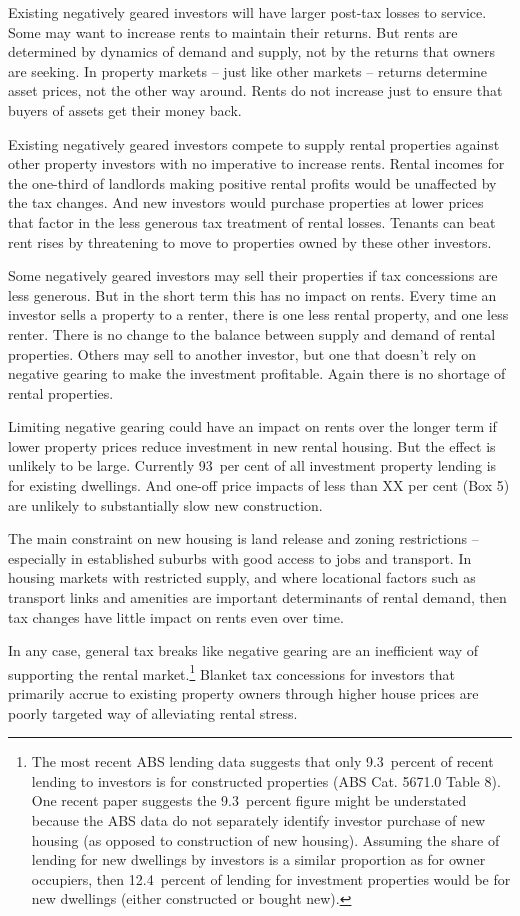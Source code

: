 \documentclass{grattan}\usepackage[]{graphicx}\usepackage[]{color}
\begin{document}
Existing negatively geared investors will have larger post-tax losses to service. Some may want to increase rents to maintain their returns. But rents are determined by dynamics of demand and supply, not by the returns that owners are seeking. In property markets -- just like other markets -- returns determine asset prices, not the other way around. Rents do not increase just to ensure that buyers of assets get their money back.

Existing negatively geared investors compete to supply rental properties against other property investors with no imperative to increase rents. Rental incomes for the one-third of landlords making positive rental profits would be unaffected by the tax changes. And new investors would purchase properties at lower prices that factor in the less generous tax treatment of rental losses. Tenants can beat rent rises by threatening to move to properties owned by these other investors. 

Some negatively geared investors may sell their properties if tax concessions are less generous. But in the short term this has no impact on rents.  Every time an investor sells a property to a renter, there is one less rental property, and one less renter. There is no change to the balance between supply and demand of rental properties. Others may sell to another investor, but one that doesn't rely on negative gearing to make the investment profitable. Again there is no shortage of rental properties. 

Limiting negative gearing could have an impact on rents over the longer term if lower property prices reduce investment in new rental housing. But the effect is unlikely to be large. Currently 93~per cent of all investment property lending is for existing dwellings.  And one-off price impacts of less than XX per cent (Box 5) are unlikely to substantially slow new construction.  

The main constraint on new housing is land release and zoning restrictions -- especially in established suburbs with good access to jobs and transport.    In housing markets with restricted supply, and where locational factors such as transport links and amenities are important determinants of rental demand, then tax changes have little impact on rents even over time. 



In any case, general tax breaks like negative gearing are an inefficient way of supporting the rental market.\footnote{ 
  The most recent ABS lending data suggests that only 9.3~percent of recent lending to investors is for constructed properties (ABS Cat. 5671.0 Table 8). One recent paper suggests the 9.3~percent figure might be understated because the ABS data do not separately identify investor purchase of new housing (as opposed to construction of new housing). Assuming the share of lending for new dwellings by investors is a similar proportion as for owner occupiers, then 12.4~percent of lending for investment properties would be for new dwellings (either constructed or bought new). }   Blanket tax concessions for investors that primarily accrue to existing property owners through higher house prices are poorly targeted way of alleviating rental stress.  
\end{document}
